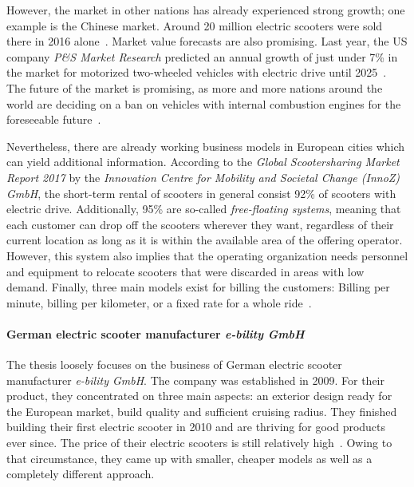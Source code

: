 \documentclass[12pt,a4paper,twoside]{report}
\begin{document}
However, the market in other nations has already experienced strong growth;
one example is the Chinese market. Around 20 million electric scooters were sold
there in 2016 alone~\cite{heise-electric-scooters}. Market value forecasts are also promising.
Last year, the US company \textit{P\&S Market Research} predicted an annual growth of
just under 7\% in the market for motorized two-wheeled vehicles with
electric drive until 2025~\cite{pands-electric-scooters}.
The future of the market is promising, as more and more nations around the world
are deciding on a ban on vehicles with internal combustion engines for the
foreseeable future~\cite{faz-combustion-engine-ban}.

Nevertheless, there are already working business models in European cities
which can yield additional information.
According to the \textit{Global Scootersharing Market Report 2017} by the
\textit{Innovation Centre for Mobility and Societal Change (InnoZ) GmbH},
the short-term rental of scooters in general consist 92\% of scooters with
electric drive. Additionally, 95\% are so-called \textit{free-floating systems},
meaning that each customer can drop off the scooters wherever they want, regardless
of their current location as long as it is within the available area of the offering operator.
However, this system also implies that the operating organization needs personnel
and equipment to relocate scooters that were discarded in areas with low demand.
Finally, three main models exist for billing the customers:
Billing per minute, billing per kilometer, or a fixed rate for a whole ride~\cite{scootersharing-report}.


\paragraph{German electric scooter manufacturer \textit{e-bility GmbH}} \label{sect:e-bility GmbH}

The thesis loosely focuses on the business of German electric scooter manufacturer \textit{e-bility GmbH}.
The company was established in 2009. For their product, they concentrated on three main aspects:
an exterior design ready for the European market, build quality and sufficient cruising radius.
They finished building their first electric scooter in 2010 and are thriving for good products ever since.
The price of their electric scooters is still relatively high~\cite{e-bility}.
Owing to that circumstance, they came up with smaller, cheaper models
as well as a completely different approach.
\end{document}
